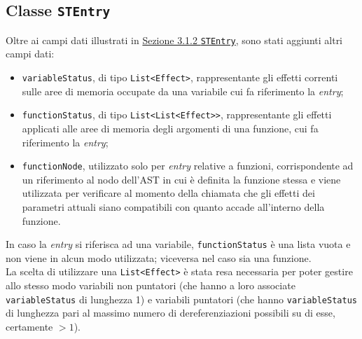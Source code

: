 \documentclass[../report.tex]{subfiles}
\begin{document}
\subsection[Classe STEntry]{Classe \texttt{STEntry}}\label{ss:stentry-effetti}
Oltre ai campi dati illustrati in \hyperref[ss:stentry]{Sezione 3.1.2 \texttt{STEntry}}, sono stati aggiunti altri campi dati:
\begin{itemize}
    \item \verb|variableStatus|, di tipo \verb|List<Effect>|, rappresentante gli effetti correnti sulle aree di memoria occupate da una variabile cui fa riferimento la \textit{entry};
    \item \verb|functionStatus|, di tipo \verb|List<List<Effect>>|, rappresentante gli effetti applicati alle aree di memoria degli argomenti di una funzione, cui fa riferimento la \textit{entry};
    \item \verb|functionNode|, utilizzato solo per \textit{entry} relative a funzioni, corrispondente ad un riferimento al nodo dell'AST in cui è definita la funzione stessa e viene utilizzata per verificare al momento della chiamata che gli effetti dei parametri attuali siano compatibili con quanto accade all'interno della funzione.
\end{itemize}
In caso la \textit{entry} si riferisca ad una variabile, \verb|functionStatus| è una lista vuota e non viene in alcun modo utilizzata; viceversa nel caso sia una funzione.\\
La scelta di utilizzare una \verb|List<Effect>| è stata resa necessaria per poter gestire allo stesso modo variabili non puntatori (che hanno a loro associate \verb|variableStatus| di lunghezza 1) e variabili puntatori (che hanno \verb|variableStatus| di lunghezza pari al massimo numero di dereferenziazioni possibili su di esse, certamente $> 1$).
\end{document}
